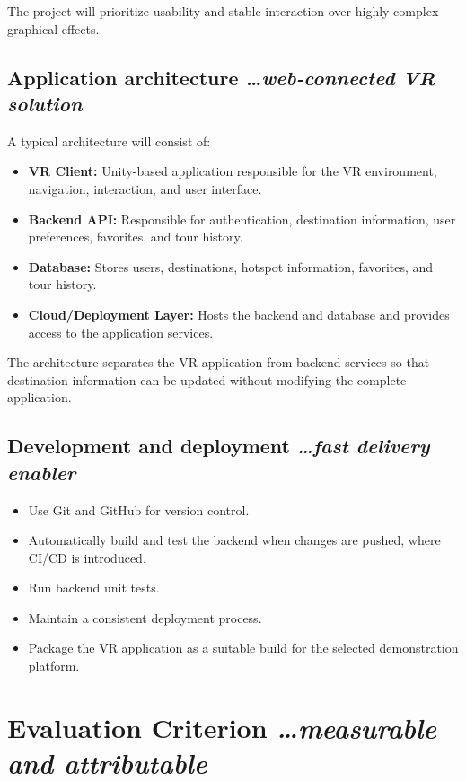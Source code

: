 \documentclass[11pt,a4paper]{article}
\newcommand{\BvrHint}[1]{%
  {\normalfont\normalsize\itshape\hfill #1}}
\begin{document}
The project will prioritize usability and stable interaction over highly complex graphical effects.

\subsection{Application architecture%
  \BvrHint{\ldots web-connected VR solution}}

A typical architecture will consist of:

\begin{itemize}[leftmargin=0.7cm]
    \item \textbf{VR Client:} Unity-based application responsible for the VR environment, navigation, interaction, and user interface.
    \item \textbf{Backend API:} Responsible for authentication, destination information, user preferences, favorites, and tour history.
    \item \textbf{Database:} Stores users, destinations, hotspot information, favorites, and tour history.
    \item \textbf{Cloud/Deployment Layer:} Hosts the backend and database and provides access to the application services.
\end{itemize}

The architecture separates the VR application from backend services so that destination information
can be updated without modifying the complete application.

\subsection{Development and deployment%
  \BvrHint{\ldots fast delivery enabler}}

\begin{itemize}[leftmargin=0.7cm]
    \item Use Git and GitHub for version control.
    \item Automatically build and test the backend when changes are pushed, where CI/CD is introduced.
    \item Run backend unit tests.
    \item Maintain a consistent deployment process.
    \item Package the VR application as a suitable build for the selected demonstration platform.
\end{itemize}

\section{Evaluation Criterion%
  \BvrHint{\ldots measurable and attributable}}
\end{document}
